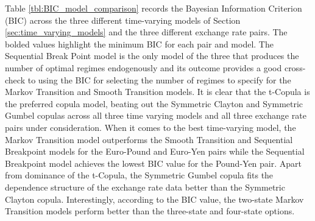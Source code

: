 Table \ref{tbl:BIC_model_comparison} records the Bayesian Information Criterion (BIC) across the three different time-varying models of Section \ref{sec:time_varying_models} and the three different exchange rate pairs. The bolded values highlight the minimum BIC for each pair and model. The Sequential Break Point model is the only model of the three that produces the number of optimal regimes endogenously and its outcome provides a good cross-check to using the BIC for selecting the number of regimes to specify for the Markov Transition and Smooth Transition models. It is clear that the t-Copula is the preferred copula model, beating out the Symmetric Clayton and Symmetric Gumbel copulas across all three time varying models and all three exchange rate pairs under consideration. When it comes to the best time-varying model, the Markov Transition model outperforms the Smooth Transition and Sequential Breakpoint models for the Euro-Pound and Euro-Yen pairs while the Sequential Breakpoint model achieves the lowest BIC value for the Pound-Yen pair. Apart from dominance of the t-Copula, the Symmetric Gumbel copula fits the dependence structure of the exchange rate data better than the Symmetric Clayton copula. Interestingly, according to the BIC value, the two-state Markov Transition models perform better than the three-state and four-state options.

